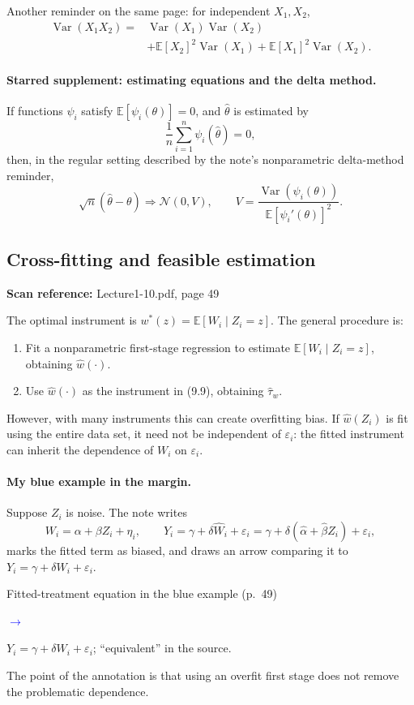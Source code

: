 \documentclass[11pt,a4paper]{article}
\newcommand{\sourcepages}[1]{\par{\small\sffamily\color{muted}\textbf{Scan reference:} #1\par}\nobreak\smallskip\nopagebreak[4]}
\newenvironment{inkblock}[1]{\par\begingroup\color{#1}}{\par\endgroup}
\newcommand{\notearrow}[3]{%
\par\Needspace{6\baselineskip}\smallskip
\noindent\begin{minipage}[c]{0.43\linewidth}\raggedright\color{#1}#2\end{minipage}%
\hfill\textcolor{#1}{\(\longrightarrow\)}\hfill%
\begin{minipage}[c]{0.43\linewidth}\raggedright#3\end{minipage}\par\smallskip}
\begin{document}
Another reminder on the same page: for independent $X_1,X_2$,
\begin{align*}
 \operatorname{Var}(X_1X_2)
 ={}&\operatorname{Var}(X_1)\operatorname{Var}(X_2)\\
 &+\mathbb E[X_2]^2\operatorname{Var}(X_1)
 +\mathbb E[X_1]^2\operatorname{Var}(X_2).
\end{align*}

\paragraph{Starred supplement: estimating equations and the delta method.}
If functions $\psi_i$ satisfy $\mathbb E[\psi_i(\theta)]=0$, and $\widehat\theta$ is estimated by
\[
 \frac1n\sum_{i=1}^n\psi_i(\widehat\theta)=0,
\]
then, in the regular setting described by the note's nonparametric delta-method reminder,
\[
 \sqrt n(\widehat\theta-\theta)\Rightarrow\mathcal N(0,V),
 \qquad
 V=\frac{\operatorname{Var}(\psi_i(\theta))}
 {\mathbb E[\psi_i'(\theta)]^2}.
\]

\subsection{Cross-fitting and feasible estimation}
\sourcepages{Lecture1-10.pdf, page 49}
The optimal instrument is $w^*(z)=\mathbb E[W_i\mid Z_i=z]$. The general procedure is:
\begin{enumerate}
 \item Fit a nonparametric first-stage regression to estimate $\mathbb E[W_i\mid Z_i=z]$, obtaining $\widehat w(\cdot)$.
 \item Use $\widehat w(\cdot)$ as the instrument in (9.9), obtaining $\widehat\tau_w$.
\end{enumerate}
However, with many instruments this can create overfitting bias. If $\widehat w(Z_i)$ is fit using the entire data set, it need not be independent of $\varepsilon_i$: the fitted instrument can inherit the dependence of $W_i$ on $\varepsilon_i$.

\paragraph{My blue example in the margin.}
\begin{inkblock}{blue}
Suppose $Z_i$ is noise. The note writes
\[
 W_i=\alpha+\beta Z_i+\eta_i,
 \qquad Y_i=\gamma+\delta\widehat W_i+\varepsilon_i
 =\gamma+\delta(\widehat\alpha+\widehat\beta Z_i)+\varepsilon_i,
\]
marks the fitted term as biased, and draws an arrow comparing it to $Y_i=\gamma+\delta W_i+\varepsilon_i$.
\notearrow{blue}{Fitted-treatment equation in the blue example (p.~49)}{$Y_i=\gamma+\delta W_i+\varepsilon_i$; ``equivalent'' in the source.}
 The point of the annotation is that using an overfit first stage does not remove the problematic dependence.
\end{inkblock}
\end{document}

